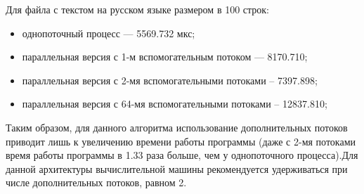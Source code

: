 Для файла с текстом на русском языке размером в 100 строк:

\begin{itemize}[label*=--]
	\item однопоточный процесс --- 5569.732 мкс;
	\item параллельная версия с 1-м вспомогательным потоком --- 8170.710;
	\item параллельная версия с 2-мя вспомогательными потоками -- 7397.898;
	\item параллельная версия с 64-мя вспомогательными потоками -- 12837.810;
\end{itemize}

Таким образом, для данного алгоритма использование дополнительных потоков приводит лишь к увеличению времени работы программы (даже с 2-мя потоками время работы программы в 1.33 раза больше, чем у однопоточного процесса).Для данной архитектуры вычислительной машины рекомендуется удерживаться при числе дополнительных потоков, равном 2.

